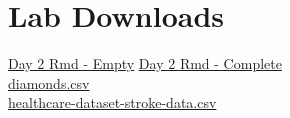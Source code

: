 \documentclass[
]{book}
\begin{document}
\section{Lab Downloads}\label{lab-downloads-1}

\href{https://drive.google.com/file/d/1-n4wRfQPD_hUYc0QyYlJdvNurmbuSVHK/view?usp=sharing}{Day 2 Rmd - Empty} \textbar{} \href{https://drive.google.com/file/d/1bA3Alzt5WV1waCt1MmXFZ3RbOZZYRiVo/view?usp=sharing}{Day 2 Rmd - Complete}\\
\href{https://drive.google.com/file/d/1iK0gcxz3R1KptcHSMNbZB0YurTquQoXl/view?usp=sharing}{diamonds.csv}\\
\href{https://drive.google.com/file/d/1CREW9KyTbeG4aufgTYIDdyMCII-nuEHs/view?usp=sharing}{healthcare-dataset-stroke-data.csv}

  
\end{document}
